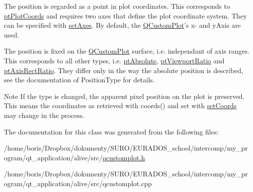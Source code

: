 \begin{DoxyItemize}
\item The position is regarded as a point in plot coordinates. This corresponds to \hyperlink{classQCPItemPosition_aad9936c22bf43e3d358552f6e86dbdc8ad5ffb8dc99ad73263f7010c77342294c}{pt\-Plot\-Coords} and requires two axes that define the plot coordinate system. They can be specified with \hyperlink{classQCPItemPosition_a2185f45c75ac8cb9be89daeaaad50e37}{set\-Axes}. By default, the \hyperlink{classQCustomPlot}{Q\-Custom\-Plot}'s x-\/ and y\-Axis are used.\end{DoxyItemize}
\begin{DoxyItemize}
\item The position is fixed on the \hyperlink{classQCustomPlot}{Q\-Custom\-Plot} surface, i.\-e. independant of axis ranges. This corresponds to all other types, i.\-e. \hyperlink{classQCPItemPosition_aad9936c22bf43e3d358552f6e86dbdc8a564f5e53e550ead1ec5fc7fc7d0b73e0}{pt\-Absolute}, \hyperlink{classQCPItemPosition_aad9936c22bf43e3d358552f6e86dbdc8ac7d6aa89ceacb39658b0d6da061c789a}{pt\-Viewport\-Ratio} and \hyperlink{classQCPItemPosition_aad9936c22bf43e3d358552f6e86dbdc8a01080fd00eaf09fa238ef6b73bbfef75}{pt\-Axis\-Rect\-Ratio}. They differ only in the way the absolute position is described, see the documentation of Position\-Type for details.\end{DoxyItemize}
\begin{DoxyNote}{Note}
If the type is changed, the apparent pixel position on the plot is preserved. This means the coordinates as retrieved with coords() and set with \hyperlink{classQCPItemPosition_aa988ba4e87ab684c9021017dcaba945f}{set\-Coords} may change in the process. 
\end{DoxyNote}


The documentation for this class was generated from the following files\-:\begin{DoxyCompactItemize}
\item 
/home/boris/\-Dropbox/dokumenty/\-S\-U\-R\-O/\-E\-U\-R\-A\-D\-O\-S\-\_\-school/intercomp/my\-\_\-program/qt\-\_\-application/alive/src/\hyperlink{qcustomplot_8h}{qcustomplot.\-h}\item 
/home/boris/\-Dropbox/dokumenty/\-S\-U\-R\-O/\-E\-U\-R\-A\-D\-O\-S\-\_\-school/intercomp/my\-\_\-program/qt\-\_\-application/alive/src/qcustomplot.\-cpp\end{DoxyCompactItemize}
